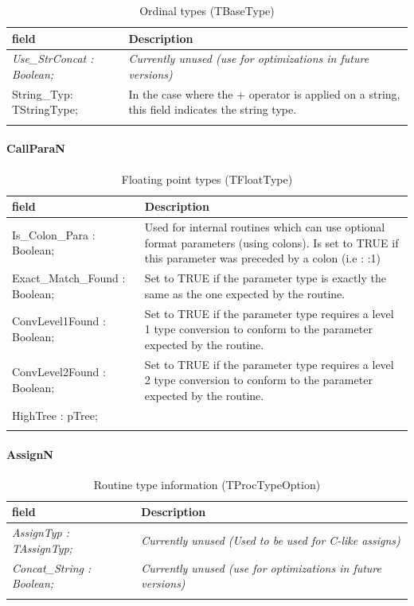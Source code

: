 \documentclass [a4paper,12pt]{article}
\begin{document}
\begin{longtable}{|l|p{10cm}|}
\hline
field	& Description \\
\hline
\endhead
\hline
\endfoot
\textsf{\textit{Use{\_}StrConcat : Boolean;}}&
	\textit{Currently unused (use for optimizations in future versions)} \\
\hline
\textsf{String{\_}Typ: TStringType;}&
	In the case where the + operator is applied on a string, this field indicates the string type. \\
\hline
\caption{Ordinal types (TBaseType)}
\label{tab9}
\end{longtable}

\paragraph{CallParaN}\mbox{}

\begin{longtable}{|l|p{10cm}|}
\hline
field	& Description \\
\hline
\endhead
\hline
\endfoot
\textsf{Is{\_}Colon{\_}Para : Boolean;}&
	Used for internal routines which can use optional format parameters
	(using colons). Is set to TRUE if this parameter was preceded by a
	colon (i.e : :1) \\
\textsf{Exact{\_}Match{\_}Found : Boolean;}&
	Set to TRUE if the parameter type is exactly the same as the one
	expected by the routine. \\
\textsf{ConvLevel1Found : Boolean;}&
	Set to TRUE if the parameter type requires a level 1 type conversion
	to conform to the parameter expected by the routine. \\
\textsf{ConvLevel2Found : Boolean;}&
	Set to TRUE if the parameter type requires a level 2 type conversion
	to conform to the parameter expected by the routine. \\
\textsf{HighTree : pTree;}&  \\
\hline
\caption{Floating point types (TFloatType)}
\label{tab10}
\end{longtable}

\paragraph{AssignN}\mbox{}

\begin{longtable}{|l|p{10cm}|}
\hline
field	& Description \\
\hline
\endhead
\hline
\endfoot
\textsf{\textit{AssignTyp : TAssignTyp;}}&
	\textit{Currently unused (Used to be used for C-like assigns)} \\
\textsf{\textit{Concat{\_}String : Boolean;}}&
	\textit{Currently unused (use for optimizations in future versions)}\\
\hline
\caption{Routine type information (TProcTypeOption)}
\end{longtable}
\end{document}
